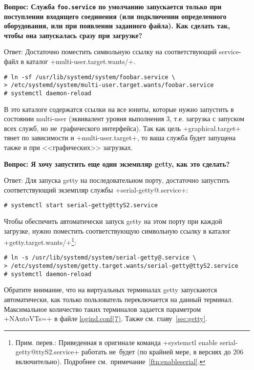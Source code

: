 \documentclass[10pt,oneside,a4paper]{article}
\newcommand{\qna}[1]{\medskip\par\textbf{Вопрос: #1}\par Ответ:}
\begin{document}
\qna{Служба \texttt{foo.service} по умолчанию запускается только при поступлении
входящего соединения (или подключении определенного оборудования, или при
появлении заданного файла). Как сделать так, чтобы она запускалась сразу при
загрузке?}
Достаточно поместить символьную ссылку на соответствующий service-файл в каталог
+multi-user.target.wants/+.
\begin{Verbatim}
# ln -sf /usr/lib/systemd/system/foobar.service \ 
> /etc/systemd/system/multi-user.target.wants/foobar.service
# systemctl daemon-reload
\end{Verbatim}

В это каталоге содержатся ссылки на все юниты, которые нужно запустить в
состоянии multi-user (эквивалент уровня выполнения 3, т.е. загрузка с запуском
всех служб, но не~графического интерфейса). Так как цель +graphical.target+
тянет по зависимости и +multi-user.target+, то ваша служба будет запущена также
и при <<графических>> загрузках.

\qna{Я хочу запустить еще один экземпляр getty, как это сделать?}
Для запуска getty на последовательном порту, достаточно запустить
соответствующий экземпляр службы +serial-getty@.service+:
\begin{Verbatim}
# systemctl start serial-getty@ttyS2.service
\end{Verbatim}

Чтобы обеспечить автоматически запуск getty на этом порту при каждой загрузке,
нужно поместить соответствующую символьную ссылку в каталог
+getty.target.wants/+\footnote{Прим. перев.: Приведенная в оригинале команда
+systemctl enable serial-getty@ttyS2.service+ работать не~будет (по крайней
мере, в версиях до 206 включительно). Подробнее 
см.~примечание~\ref{ftn:enableserial}.}:
\begin{Verbatim}
# ln -s /usr/lib/systemd/system/serial-getty@.service \
> /etc/systemd/system/getty.target.wants/serial-getty@ttyS2.service
# systemctl daemon-reload
\end{Verbatim}

Обратите внимание, что на виртуальных терминалах getty запускаются
автоматически, как только пользователь переключается на данный терминал.
Максимальное количество таких терминалов задается параметром +NAutoVTs=+ в файле
\href{http://www.freedesktop.org/software/systemd/man/logind.html}%
{logind.conf(7)}. Также см. главу~\ref{sec:getty}.
\end{document}

